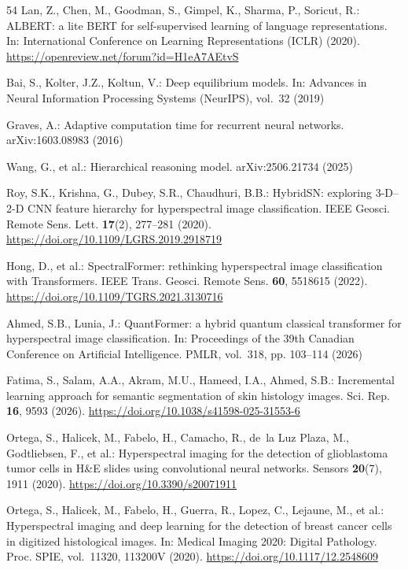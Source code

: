 \documentclass{svproc}
\begin{document}
\begin{thebibliography}{54}
Lan, Z., Chen, M., Goodman, S., Gimpel, K., Sharma, P., Soricut, R.: ALBERT: a lite BERT for self-supervised learning of language representations. In: International Conference on Learning Representations (ICLR) (2020). \url{https://openreview.net/forum?id=H1eA7AEtvS}

Bai, S., Kolter, J.Z., Koltun, V.: Deep equilibrium models. In: Advances in Neural Information Processing Systems (NeurIPS), vol.~32 (2019)

Graves, A.: Adaptive computation time for recurrent neural networks. arXiv:1603.08983 (2016)

Wang, G., et al.: Hierarchical reasoning model. arXiv:2506.21734 (2025)

Roy, S.K., Krishna, G., Dubey, S.R., Chaudhuri, B.B.: HybridSN: exploring 3-D--2-D CNN feature hierarchy for hyperspectral image classification. IEEE Geosci. Remote Sens. Lett. \textbf{17}(2), 277--281 (2020). \url{https://doi.org/10.1109/LGRS.2019.2918719}

Hong, D., et al.: SpectralFormer: rethinking hyperspectral image classification with Transformers. IEEE Trans. Geosci. Remote Sens. \textbf{60}, 5518615 (2022). \url{https://doi.org/10.1109/TGRS.2021.3130716}

Ahmed, S.B., Lunia, J.: QuantFormer: a hybrid quantum classical transformer for hyperspectral image classification. In: Proceedings of the 39th Canadian Conference on Artificial Intelligence. PMLR, vol.~318, pp. 103--114 (2026)

Fatima, S., Salam, A.A., Akram, M.U., Hameed, I.A., Ahmed, S.B.: Incremental learning approach for semantic segmentation of skin histology images. Sci. Rep. \textbf{16}, 9593 (2026). \url{https://doi.org/10.1038/s41598-025-31553-6}

Ortega, S., Halicek, M., Fabelo, H., Camacho, R., de~la Luz Plaza, M., Godtliebsen, F., et al.: Hyperspectral imaging for the detection of glioblastoma tumor cells in H\&E slides using convolutional neural networks. Sensors \textbf{20}(7), 1911 (2020). \url{https://doi.org/10.3390/s20071911}

Ortega, S., Halicek, M., Fabelo, H., Guerra, R., Lopez, C., Lejaune, M., et al.: Hyperspectral imaging and deep learning for the detection of breast cancer cells in digitized histological images. In: Medical Imaging 2020: Digital Pathology. Proc. SPIE, vol.~11320, 113200V (2020). \url{https://doi.org/10.1117/12.2548609}


\end{thebibliography}
\end{document}
